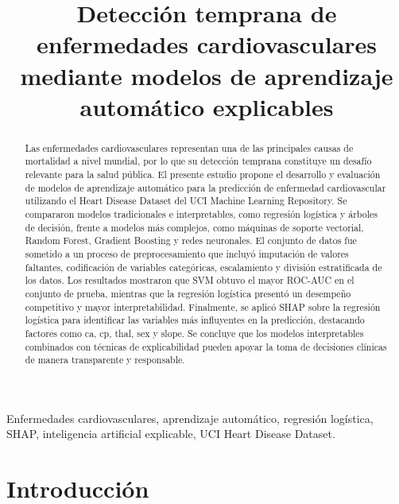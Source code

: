 \documentclass[conference]{IEEEtran}
\begin{document}
\title{Detección temprana de enfermedades cardiovasculares mediante modelos de aprendizaje automático explicables}

\author{
}

\maketitle

\begin{abstract}
Las enfermedades cardiovasculares representan una de las principales causas de mortalidad a nivel mundial, por lo que su detección temprana constituye un desafío relevante para la salud pública. El presente estudio propone el desarrollo y evaluación de modelos de aprendizaje automático para la predicción de enfermedad cardiovascular utilizando el Heart Disease Dataset del UCI Machine Learning Repository. Se compararon modelos tradicionales e interpretables, como regresión logística y árboles de decisión, frente a modelos más complejos, como máquinas de soporte vectorial, Random Forest, Gradient Boosting y redes neuronales. El conjunto de datos fue sometido a un proceso de preprocesamiento que incluyó imputación de valores faltantes, codificación de variables categóricas, escalamiento y división estratificada de los datos. Los resultados mostraron que SVM obtuvo el mayor ROC-AUC en el conjunto de prueba, mientras que la regresión logística presentó un desempeño competitivo y mayor interpretabilidad. Finalmente, se aplicó SHAP sobre la regresión logística para identificar las variables más influyentes en la predicción, destacando factores como ca, cp, thal, sex y slope. Se concluye que los modelos interpretables combinados con técnicas de explicabilidad pueden apoyar la toma de decisiones clínicas de manera transparente y responsable.
\end{abstract}

\begin{IEEEkeywords}
Enfermedades cardiovasculares, aprendizaje automático, regresión logística, SHAP, inteligencia artificial explicable, UCI Heart Disease Dataset.
\end{IEEEkeywords}

\section{Introducción}
\end{document}
